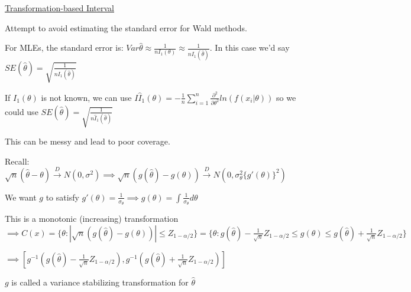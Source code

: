 \documentclass{article}
\newcommand{\dto}{\overset{D}{\to}}
\let\Oldint=\int
\let\Oldsum=\sum
\renewcommand{\int}{\Oldint\limits}
\renewcommand{\sum}{\Oldsum\limits}
\begin{document}
\underline{Transformation-based Interval}

Attempt to avoid estimating the standard error for Wald methods.

For MLEs, the standard error is: $Var{\hat{\theta}} \approx \frac{1}{n I_1(\theta)} \approx \frac{1}{n I_1(\hat{\theta})}$. In this case we'd say $SE(\hat{\theta}) = \sqrt{\frac{1}{n I_1(\hat{\theta})}}$

If $I_1(\theta)$ is not known, we can use $I\hat{I}_1(\theta) = -\frac{1}{n}\sum_{i=1}^n \frac{\partial^2}{\partial \theta^2} ln(f(x_i|\theta))$ so we could use $SE(\hat{\theta}) = \sqrt{\frac{1}{n \hat{I}_1(\hat{\theta})}}$

This can be messy and lead to poor coverage. 

Recall: $\sqrt{n}(\hat{\theta} - \theta) \dto N(0, \sigma^2) \implies \sqrt{n}(g(\hat{\theta}) - g(\theta)) \dto N(0, \sigma^2_{\theta}\{g'(\theta)\}^2)$

We want $g$ to satisfy $g'(\theta) = \frac{1}{\sigma_{\theta}} \implies g(\theta) = \int \frac{1}{\sigma_\theta}d\theta$

This is a monotonic (increasing) transformation $\implies C(x) = \{\theta: |\sqrt{n}(g(\hat{\theta}) - g(\theta))| \le Z_{1-\alpha/2}\} = \{\theta: g(\hat{\theta}) - \frac{1}{\sqrt{n}}Z_{1-\alpha/2} \le g(\theta) \le g(\hat{\theta}) + \frac{1}{\sqrt{n}}Z_{1-\alpha/2}\}$

$\implies [g^{-1}(g(\hat{\theta}) - \frac{1}{\sqrt{n}}Z_{1-\alpha/2}), g^{-1}(g(\hat{\theta}) + \frac{1}{\sqrt{n}}Z_{1-\alpha/2})]$

$g$ is called a variance stabilizing transformation for $\hat{\theta}$
\end{document}
